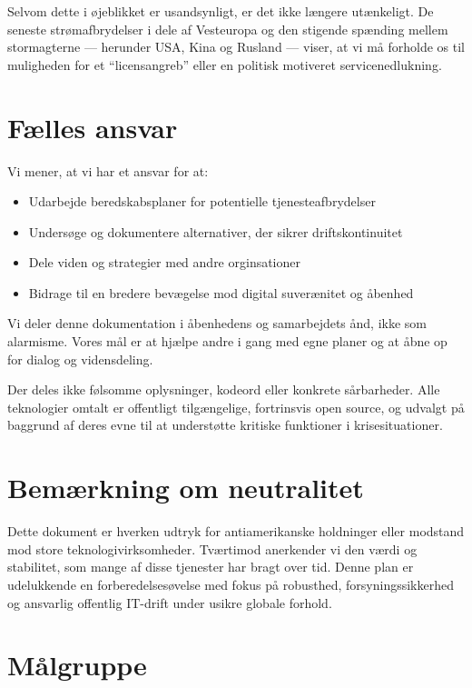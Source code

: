 \documentclass[a4paper,11pt,oneside]{book}
\def\tightlist{}
\begin{document}
Selvom dette i øjeblikket er usandsynligt, er det ikke længere
utænkeligt. De seneste strømafbrydelser i dele af Vesteuropa og den
stigende spænding mellem stormagterne --- herunder USA, Kina og Rusland
--- viser, at vi må forholde os til muligheden for et ``licensangreb''
eller en politisk motiveret servicenedlukning.

\section{Fælles ansvar}\label{fuxe6lles-ansvar}

Vi mener, at vi har et ansvar for at:

\begin{itemize}
\tightlist
\item
  Udarbejde beredskabsplaner for potentielle tjenesteafbrydelser
\item
  Undersøge og dokumentere alternativer, der sikrer driftskontinuitet
\item
  Dele viden og strategier med andre orginsationer
\item
  Bidrage til en bredere bevægelse mod digital suverænitet og åbenhed
\end{itemize}

Vi deler denne dokumentation i åbenhedens og samarbejdets ånd, ikke som
alarmisme. Vores mål er at hjælpe andre i gang med egne planer og at
åbne op for dialog og vidensdeling.

Der deles ikke følsomme oplysninger, kodeord eller konkrete sårbarheder.
Alle teknologier omtalt er offentligt tilgængelige, fortrinsvis open
source, og udvalgt på baggrund af deres evne til at understøtte kritiske
funktioner i krisesituationer.

\section{Bemærkning om neutralitet}\label{bemuxe6rkning-om-neutralitet}

Dette dokument er hverken udtryk for antiamerikanske holdninger eller
modstand mod store teknologivirksomheder. Tværtimod anerkender vi den
værdi og stabilitet, som mange af disse tjenester har bragt over tid.
Denne plan er udelukkende en forberedelsesøvelse med fokus på robusthed,
forsyningssikkerhed og ansvarlig offentlig IT-drift under usikre globale
forhold.

\section{Målgruppe}\label{muxe5lgruppe}
\end{document}
